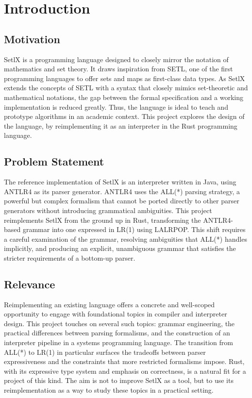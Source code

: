 \chapter{Introduction}

\section{Motivation}

SetlX\cite{setlx-tutorial} is a programming language designed to closely mirror the notation of mathematics and set theory. It draws inspiration from SETL\cite{schwartz-setl}, one of the first programming languages to offer sets and maps as first-class data types. As SetlX extends the concepts of SETL with a syntax that closely mimics set-theoretic and mathematical notations, the gap between the formal specification and a working implementation is reduced greatly. Thus, the language is ideal to teach and prototype algorithms in an academic context. This project explores the design of the language, by reimplementing it as an interpreter in the Rust programming language.

\section{Problem Statement}

The reference implementation of SetlX is an interpreter written in Java, using ANTLR4\cite{antlr4} as its parser generator. ANTLR4 uses the ALL(*) parsing strategy, a powerful but complex formalism that cannot be ported directly to other parser generators without introducing grammatical ambiguities. This project reimplements SetlX from the ground up in Rust, transforming the ANTLR4-based grammar into one expressed in LR(1) using LALRPOP\cite{lalrpop}. This shift requires a careful examination of the grammar, resolving ambiguities that ALL(*) handles implicitly, and producing an explicit, unambiguous grammar that satisfies the stricter requirements of a bottom-up parser.

\section{Relevance}

Reimplementing an existing language offers a concrete and well-scoped opportunity to engage with foundational topics in compiler and interpreter design. This project touches on several such topics: grammar engineering, the practical differences between parsing formalisms, and the construction of an interpreter pipeline in a systems programming language. The transition from ALL(*) to LR(1) in particular surfaces the tradeoffs between parser expressiveness and the constraints that more restricted formalisms impose. Rust, with its expressive type system and emphasis on correctness, is a natural fit for a project of this kind. The aim is not to improve SetlX as a tool, but to use its reimplementation as a way to study these topics in a practical setting.

